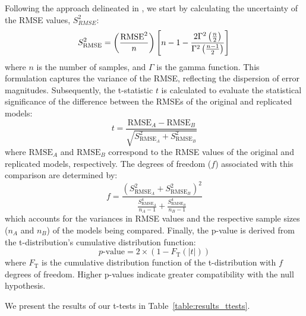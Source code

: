 Following the approach delineated in \citet{andersonImprovedAccuracyQuantitative2017}, we start by calculating the uncertainty of the RMSE values, $S_{RMSE}^2$:
$$
S_{\text{RMSE}}^2 = \left(\frac{\text{RMSE}^2}{n}\right) \left[n - 1 - \frac{2\Gamma^2\left(\frac{n}{2}\right)}{\Gamma^2\left(\frac{n - 1}{2}\right)}\right] \\
$$
where $n$ is the number of samples, and $\Gamma$ is the gamma function. This formulation captures the variance of the RMSE, reflecting the dispersion of error magnitudes.
Subsequently, the t-statistic $t$ is calculated to evaluate the statistical significance of the difference between the RMSEs of the original and replicated models:
$$
t = \frac{\text{RMSE}_A - \text{RMSE}_B}{\sqrt{S_{\text{RMSE}_A}^2 + S_{\text{RMSE}_B}^2}}
$$
where $\text{RMSE}_A$ and $\text{RMSE}_B$ correspond to the RMSE values of the original and replicated models, respectively.
The degrees of freedom ($f$) associated with this comparison are determined by:
$$
f = \frac{\left(S_{\text{RMSE}_A}^2 + S_{\text{RMSE}_B}^2\right)^2}{\frac{S^4_{\text{RMSE}_A}}{n_A - 1} + \frac{S^4_{\text{RMSE}_B}}{n_B - 1}}
$$
which accounts for the variances in RMSE values and the respective sample sizes ($n_A$ and $n_B$) of the models being compared.
Finally, the p-value is derived from the t-distribution's cumulative distribution function:
$$p\text{-value} = 2 \times \left(1 - F_{\text{T}}(|t|)\right)$$
where $F_{\text{T}}$ is the cumulative distribution function of the t-distribution with $f$ degrees of freedom. 
Higher p-values indicate greater compatibility with the null hypothesis.

We present the results of our t-tests in Table~\ref{table:results_ttests}.

